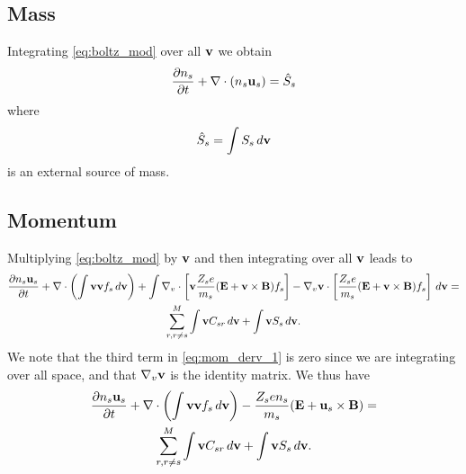 \documentclass[a4paper,11pt]{report}
\begin{document}
\subsection{Mass}
Integrating \cref{eq:boltz_mod} over all $\mathbf{v}$ we obtain
\begin{equation}
\frac{\partial n_s}{\partial t} + \nabla \cdot \left ( n_s \mathbf{u}_s \right ) = \hat{S}_s
\end{equation}
where 
\begin{equation}
\hat{S}_s = \int S_s \, d\mathbf{v}
\end{equation}
is an external source of mass.

\subsection{Momentum}
Multiplying \cref{eq:boltz_mod} by $\mathbf{v}$ and then integrating over all $\mathbf{v}$ leads to
\begin{multline}
\label{eq:mom_derv_1}
\frac{\partial n_s \mathbf{u}_s}{\partial t} + \nabla \cdot \left ( \int \mathbf{v} \mathbf{v} f_s \, d\mathbf{v} \right) + \int \nabla_v \cdot \left [ \mathbf{v} \frac{Z_s e}{m_s} ( \mathbf{E} + \mathbf{v} \times \mathbf{B} ) f_s \right ] - \nabla_v \mathbf{v} \cdot \left [ \frac{Z_s e}{m_s} ( \mathbf{E} + \mathbf{v} \times \mathbf{B} ) f_s \right ] \, d\mathbf{v} =\\
\sum_{r, r \ne s}^M \int \mathbf{v} C_{s r} \, d\mathbf{v} + \int \mathbf{v} S_s \, d\mathbf{v}.
\end{multline}
We note that the third term in \cref{eq:mom_derv_1} is zero since we are integrating over all space, and that $\nabla_v \mathbf{v}$ is the identity matrix. We thus have
\begin{multline}
\label{eq:mom_derv_2}
\frac{\partial n_s \mathbf{u}_s}{\partial t} + \nabla \cdot \left ( \int \mathbf{v} \mathbf{v} f_s \, d\mathbf{v} \right) - \frac{Z_s e n_s}{m_s} ( \mathbf{E} + \mathbf{u}_s \times \mathbf{B} ) =\\
\sum_{r, r \ne s}^M \int \mathbf{v} C_{s r} \, d\mathbf{v} + \int \mathbf{v} S_s \, d\mathbf{v}.
\end{multline}
\end{document}
